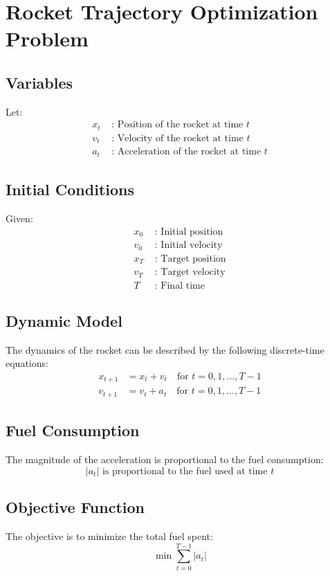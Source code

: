 \documentclass{article}
\begin{document}
\section*{Rocket Trajectory Optimization Problem}

\subsection*{Variables}
Let:
\begin{align*}
    x_t & \text{ : Position of the rocket at time } t \\
    v_t & \text{ : Velocity of the rocket at time } t \\
    a_t & \text{ : Acceleration of the rocket at time } t
\end{align*}

\subsection*{Initial Conditions}
Given:
\begin{align*}
    x_0 & \text{ : Initial position} \\
    v_0 & \text{ : Initial velocity} \\
    x_T & \text{ : Target position} \\
    v_T & \text{ : Target velocity} \\
    T & \text{ : Final time}
\end{align*}

\subsection*{Dynamic Model}
The dynamics of the rocket can be described by the following discrete-time equations:
\begin{align}
    x_{t+1} &= x_t + v_t \quad \text{for } t = 0, 1, \ldots, T-1 \\
    v_{t+1} &= v_t + a_t \quad \text{for } t = 0, 1, \ldots, T-1
\end{align}

\subsection*{Fuel Consumption}
The magnitude of the acceleration is proportional to the fuel consumption:
\[
|a_t| \text{ is proportional to the fuel used at time } t
\]

\subsection*{Objective Function}
The objective is to minimize the total fuel spent:
\[
\min \sum_{t=0}^{T-1} |a_t|
\]
\end{document}
